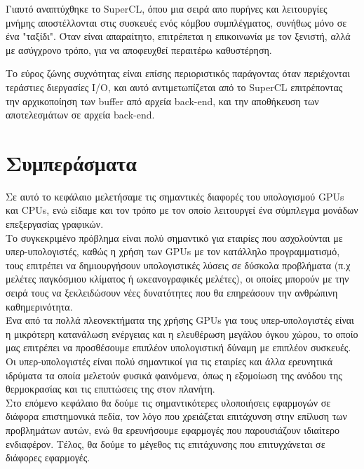 Γιαυτό αναπτύχθηκε το SuperCL, όπου μια σειρά απο πυρήνες και λειτουργίες μνήμης αποστέλλονται στις συσκευές ενός κόμβου συμπλέγματος, συνήθως μόνο σε ένα "ταξίδι". Όταν είναι απαραίτητο, επιτρέπεται η επικοινωνία με τον ξενιστή, αλλά με ασύγχρονο τρόπο, για να αποφευχθεί περαιτέρω καθυστέρηση. 

Το εύρος ζώνης συχνότητας είναι επίσης περιοριστικός παράγοντας όταν περιέχονται τεράστιες διεργασίες I/O, και αυτό αντιμετωπίζεται από το SuperCL επιτρέποντας την αρχικοποίηση των buffer από αρχεία back-end, και την αποθήκευση των αποτελεσμάτων σε αρχεία back-end.\cite{virtualcl-5}

\section{Συμπεράσματα}
Σε αυτό το κεφάλαιο μελετήσαμε τις σημαντικές διαφορές του υπολογισμού GPUs και CPUs, ενώ είδαμε και τον τρόπο με τον οποίο λειτουργεί ένα σύμπλεγμα μονάδων επεξεργασίας γραφικών. \\

Το συγκεκριμένο πρόβλημα είναι πολύ σημαντικό για εταιρίες που ασχολούνται με υπερ-υπολογιστές, καθώς η χρήση των GPUs με τον κατάλληλο προγραμματισμό, τους επιτρέπει να δημιουργήσουν υπολογιστικές λύσεις σε δύσκολα προβλήματα (π.χ μελέτες παγκόσμιου κλίματος ή ωκεανογραφικές μελέτες), οι οποίες μπορούν με την σειρά τους να ξεκλειδώσουν νέες δυνατότητες που θα επηρεάσουν την ανθρώπινη καθημερινότητα.\\

Ένα από τα πολλά πλεονεκτήματα της χρήσης GPUs για τους υπερ-υπολογιστές είναι η μικρότερη κατανάλωση ενέργειας και η ελευθέρωση μεγάλου όγκου χώρου, το οποίο μας επιτρέπει να προσθέσουμε επιπλέον υπολογιστική δύναμη με επιπλέον συσκευές. Οι υπερ-υπολογιστές είναι πολύ σημαντικοί για τις εταιρίες και άλλα ερευνητικά ιδρύματα τα οποία μελετούν φυσικά φαινόμενα, όπως η εξομοίωση της ανόδου της θερμοκρασίας και τις επιπτώσεις της στον πλανήτη.\\

Στο επόμενο κεφάλαιο θα δούμε τις σημαντικότερες υλοποιήσεις εφαρμογών σε διάφορα επιστημονικά πεδία, τον λόγο που χρειάζεται επιτάχυνση στην επίλυση των προβλημάτων αυτών, ενώ θα ερευνήσουμε εφαρμογές που παρουσιάζουν ιδιαίτερο ενδιαφέρον. Τέλος, θα δούμε το μέγεθος τις επιτάχυνσης που επιτυγχάνεται σε διάφορες εφαρμογές.